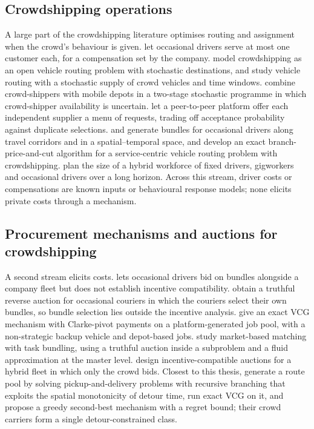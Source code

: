 \subsection{Crowdshipping operations}

A large part of the crowdshipping literature optimises routing and
assignment when the crowd's behaviour is given. \citet{archetti2016vrpod}
let occasional drivers serve at most one customer each, for a compensation
set by the company. \citet{torres2022crowdshipping} model crowdshipping as an
open vehicle routing problem with stochastic destinations, and
\citet{torres2022stochastic} study vehicle routing with a stochastic supply
of crowd vehicles and time windows. \citet{mousavi2022stochastic} combine
crowd-shippers with mobile depots in a two-stage stochastic programme in
which crowd-shipper availability is uncertain. \citet{ausseil2022supplier}
let a peer-to-peer platform offer each independent supplier a menu of
requests, trading off acceptance probability against duplicate selections.
\citet{mancini2022bundle} and \citet{mancini2024bundle} generate bundles for
occasional drivers along travel corridors and in a spatial--temporal space,
and \citet{zhou2026service} develop an exact branch-price-and-cut algorithm
for a service-centric vehicle routing problem with crowdshipping.
\citet{luy2024workforce} plan the size of a hybrid workforce of fixed
drivers, gigworkers and occasional drivers over a long horizon. Across this
stream, driver costs or compensations are known inputs or behavioural
response models; none elicits private costs through a mechanism.

\subsection{Procurement mechanisms and auctions for crowdshipping}

A second stream elicits costs. \citet{triki2021combinatorial} lets
occasional drivers bid on bundles alongside a company fleet but does not
establish incentive compatibility. \citet{chen2023truthful} obtain a
truthful reverse auction for occasional couriers in which the couriers
select their own bundles, so bundle selection lies outside the incentive
analysis. \citet{zou2022mechanisms} give an exact VCG mechanism with
Clarke-pivot payments on a platform-generated job pool, with a
non-strategic backup vehicle and depot-based jobs. \citet{oyama2025market}
study market-based matching with task bundling, using a truthful auction
inside a subproblem and a fluid approximation at the master level.
\citet{xu2026incentive} design incentive-compatible auctions for a hybrid
fleet in which only the crowd bids. Closest to this thesis,
\citet{li2026auction} generate a route pool by solving pickup-and-delivery
problems with recursive branching that exploits the spatial monotonicity of
detour time, run exact VCG on it, and propose a greedy second-best mechanism
with a regret bound; their crowd carriers form a single detour-constrained
class.

